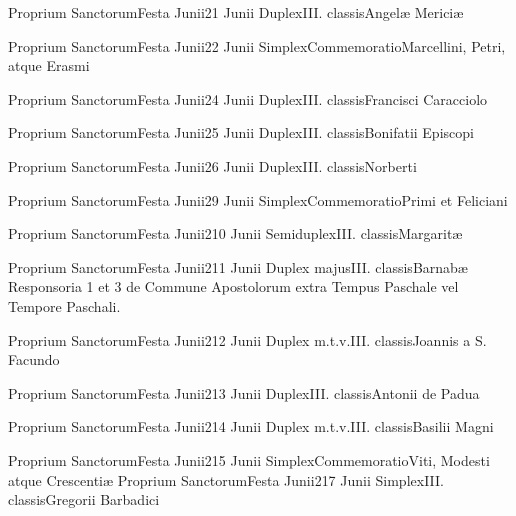 \documentclass[liber-responsorialis_sanctorale.tex]{subfiles}
\begin{document}

	{Proprium Sanctorum}{Festa Junii}{2}{1 Junii}
	{Duplex}{III. classis}{Angelæ Mericiæ}
	{\vnrubric}
	{\respdetemp}

	{Proprium Sanctorum}{Festa Junii}{2}{2 Junii}
	{Simplex}{Commemoratio}{Marcellini, Petri, atque Erasmi}
	{}
	{}
\rubric{\respdetemp}

	{Proprium Sanctorum}{Festa Junii}{2}{4 Junii}
	{Duplex}{III. classis}{Francisci Caracciolo}
	{\coporubric}
	{\respdetemp}

	{Proprium Sanctorum}{Festa Junii}{2}{5 Junii}
	{Duplex}{III. classis}{Bonifatii Episcopi}
	{\umvelrubric}
	{\respdetemp}

	{Proprium Sanctorum}{Festa Junii}{2}{6 Junii}
	{Duplex}{III. classis}{Norberti}
	{\coporubric}
	{\respdetemp}

	{Proprium Sanctorum}{Festa Junii}{2}{9 Junii}
	{Simplex}{Commemoratio}{Primi et Feliciani}
	{}
	{}
\rubric{\respdetemp}

	{Proprium Sanctorum}{Festa Junii}{2}{10 Junii}
	{Semiduplex}{III. classis}{Margaritæ}
	{\nnrubric}
	{\respdetemp}

	{Proprium Sanctorum}{Festa Junii}{2}{11 Junii}
	{Duplex majus}{III. classis}{Barnabæ}
	{\apvelrubric}
	{Responsoria 1 et 3 de Commune Apostolorum extra Tempus Paschale vel Tempore Paschali.}

	{Proprium Sanctorum}{Festa Junii}{2}{12 Junii}
	{Duplex m.t.v.}{III. classis}{Joannis a S. Facundo}
	{\conprubric}
	{\respdetemp}

	{Proprium Sanctorum}{Festa Junii}{2}{13 Junii}
	{Duplex}{III. classis}{Antonii de Padua}
	{\conprubric}
	{\respdetemp}

	{Proprium Sanctorum}{Festa Junii}{2}{14 Junii}
	{Duplex m.t.v.}{III. classis}{Basilii Magni}
	{\conpdorubric}
	{\respdetemp}

	{Proprium Sanctorum}{Festa Junii}{2}{15 Junii}
	{Simplex}{Commemoratio}{Viti, Modesti atque Crescentiæ}
	{}
	{}
\rubric{\respdetemp}
	{Proprium Sanctorum}{Festa Junii}{2}{17 Junii}
	{Simplex}{III. classis}{Gregorii Barbadici}
	{}
	{}
\rubric{\respdetemp}
\end{document}
